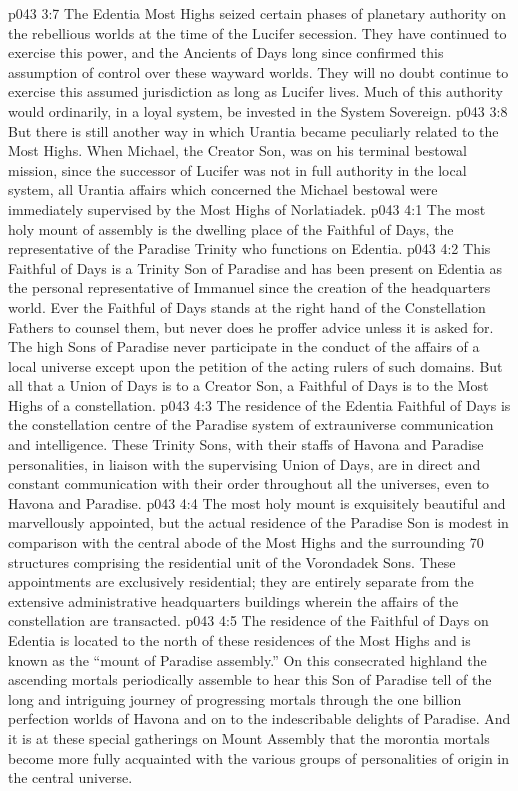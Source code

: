\vs p043 3:7 The Edentia Most Highs seized certain phases of planetary authority on the rebellious worlds at the time of the Lucifer secession. They have continued to exercise this power, and the Ancients of Days long since confirmed this assumption of control over these wayward worlds. They will no doubt continue to exercise this assumed jurisdiction as long as Lucifer lives. Much of this authority would ordinarily, in a loyal system, be invested in the System Sovereign.
\vs p043 3:8 But there is still another way in which Urantia became peculiarly related to the Most Highs. When Michael, the Creator Son, was on his terminal bestowal mission, since the successor of Lucifer was not in full authority in the local system, all Urantia affairs which concerned the Michael bestowal were immediately supervised by the Most Highs of Norlatiadek.
\vs p043 4:1 The most holy mount of assembly is the dwelling place of the Faithful of Days, the representative of the Paradise Trinity who functions on Edentia.
\vs p043 4:2 This Faithful of Days is a Trinity Son of Paradise and has been present on Edentia as the personal representative of Immanuel since the creation of the headquarters world. Ever the Faithful of Days stands at the right hand of the Constellation Fathers to counsel them, but never does he proffer advice unless it is asked for. The high Sons of Paradise never participate in the conduct of the affairs of a local universe except upon the petition of the acting rulers of such domains. But all that a Union of Days is to a Creator Son, a Faithful of Days is to the Most Highs of a constellation.
\vs p043 4:3 The residence of the Edentia Faithful of Days is the constellation centre of the Paradise system of extrauniverse communication and intelligence. These Trinity Sons, with their staffs of Havona and Paradise personalities, in liaison with the supervising Union of Days, are in direct and constant communication with their order throughout all the universes, even to Havona and Paradise.
\vs p043 4:4 The most holy mount is exquisitely beautiful and marvellously appointed, but the actual residence of the Paradise Son is modest in comparison with the central abode of the Most Highs and the surrounding 70 structures comprising the residential unit of the Vorondadek Sons. These appointments are exclusively residential; they are entirely separate from the extensive administrative headquarters buildings wherein the affairs of the constellation are transacted.
\vs p043 4:5 The residence of the Faithful of Days on Edentia is located to the north of these residences of the Most Highs and is known as the “mount of Paradise assembly.” On this consecrated highland the ascending mortals periodically assemble to hear this Son of Paradise tell of the long and intriguing journey of progressing mortals through the one billion perfection worlds of Havona and on to the indescribable delights of Paradise. And it is at these special gatherings on Mount Assembly that the morontia mortals become more fully acquainted with the various groups of personalities of origin in the central universe.
